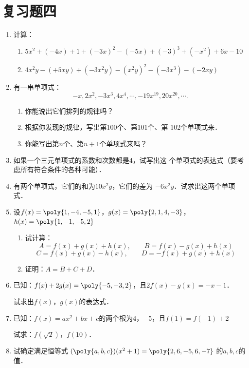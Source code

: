 \section*{复习题四}
\begin{enumerate}
    \item 计算：
    \begin{enumerate}
        \item $5x^2+(-4x)+1+(-3x)^2-(-5x)+(-3)^3+(-x^2)+6x-10$
        \item $4x^2y-(+5xy)+(-3x^2y)-(x^2y)^2-(-3x^3)-(-2xy)$
    \end{enumerate}
\item 有一串单项式：
\[-x,2x^2,-3x^3,4x^4,\cdots,-19x^{19},20x^{20},\cdots. \]
\begin{enumerate}
    \item 你能说出它们排列的规律吗？
    \item 根据你发现的规律，写出第100个、第101个、第
102个单项式来．
\item 你能写出第$n$个、第$n+1$个单项式来吗？
\end{enumerate}

\item 如果一个三元单项式的系数和次数都是4，试写出这
个单项式的表达式（要考虑所有符合条件的各种可能）．
\item  有两个单项式，它们的和为$10x^2y$，它们的差为
$-6x^2y$．试求出这两个单项式．

\item 设$f(x)=\poly{1,-4,-5,1}$，$g(x)=\poly{2,1,4,-3}$，$h(x)=\poly{1,-1,-5,2}$
\begin{enumerate}
    \item 试计算：
    \[A=f(x)+g(x)+h(x),\qquad B=f(x)-g(x)+h(x)\]
    \[C=f(x)+g(x)-h(x),\qquad D=-f(x)+g(x)+h(x)\]
    \item 证明：$A=B+C+D$．
\end{enumerate}

\item 已知：$f(x)+2g(x)=\poly{-5,-3,2}$，且$2f(x)-g(x)=-x-1$．

试求出$f(x)$，$g(x)$的表达式．

\item 已知：$f(x)=ax^2+bx+c$的两个根为4，$-5$，且$f(1)=f(-1)+2$

试求：$f\left(\sqrt{2}\right)$，$f(10)$．

\item 试确定满足恒等式
$(\poly{a,b,c})(x^2+1)=\poly{2,6,-5,6,-7}$
的$a,b,c$的值．


\end{enumerate}
